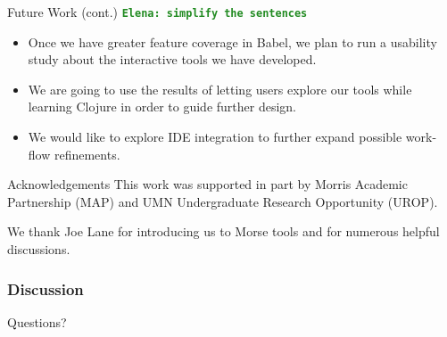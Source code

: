 \documentclass{beamer}
\newcommand{\comment}[1]{{\bf \tt  {#1}}}
\newcommand{\emcomment}[1]{\textcolor{ForestGreen}{\comment{Elena: {#1}}}}
\begin{document}
\begin{frame}{Future Work (cont.)}
\emcomment{simplify the sentences}
  \begin{itemize}
    \item<1-> Once we have greater feature coverage in Babel, we plan to run a usability study about the interactive tools we have developed.
    \item<2-> We are going to use the results of letting users explore our tools while learning Clojure in order to guide further design. 
    \item<3-> We would like to explore IDE integration to further expand possible work-flow refinements.
  \end{itemize}
\end{frame}

\begin{frame}{Acknowledgements}
This work was supported in part by Morris Academic Partnership (MAP) and UMN Undergraduate Research Opportunity (UROP).  \\ 

\vspace*{0.2in}

We thank Joe Lane for introducing us to Morse tools and for numerous helpful discussions.
\end{frame}

\begin{frame}
  \frametitle{Discussion}
Questions?
\end{frame}
\end{document}
